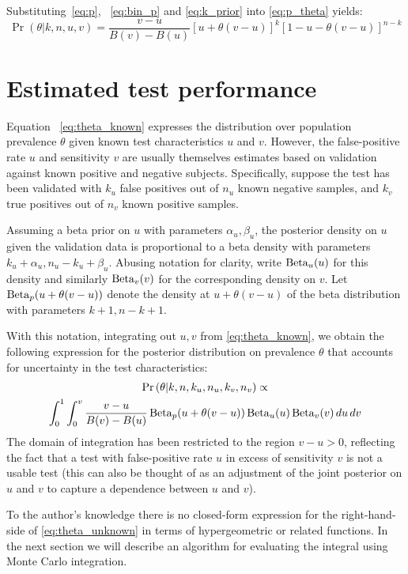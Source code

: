 \documentclass[dvipdfmx]{article}
\begin{document}
Substituting~\eqref{eq:p}, ~\eqref{eq:bin_p} and \eqref{eq:k_prior} into \eqref{eq:p_theta} yields:
\begin{equation}
  \label{eq:theta_known}
  \Pr\left(\theta|k,n,u,v\right) = \frac{v-u}{B(v)-B(u)} [u + \theta(v-u)]^k [1- u - \theta(v-u)]^{n-k}
\end{equation}

\section{Estimated test performance}
Equation ~\eqref{eq:theta_known} expresses the distribution over
population prevalence $\theta$ given known test characteristics $u$
and $v$. However, the false-positive rate $u$ and sensitivity $v$ are
usually themselves estimates based on validation against known
positive and negative subjects. Specifically, suppose the test has
been validated with $k_u$ false positives out of $n_u$ known negative
samples, and $k_v$ true positives out of $n_v$ known positive samples.

Assuming a beta prior on $u$ with parameters $\alpha_u, \beta_u$, the
posterior density on $u$ given the validation data is proportional to
a beta density with parameters $k_u+\alpha_u,n_u-k_u+\beta_u$. Abusing
notation for clarity, write $\operatorname{Beta}_u(u)$ for this density and similarly
$\operatorname{Beta}_v(v)$ for the corresponding density on $v$. Let $\operatorname{Beta}_p(u
+\theta(v-u))$ denote the density at $u +\theta(v-u)$ of the beta
distribution with parameters $k+1,n-k+1$.

With this notation, integrating out $u,v$ from \eqref{eq:theta_known},
we obtain the following expression for the posterior distribution on
prevalence $\theta$ that accounts for uncertainty in the test
characteristics:
\begin{multline}
  \label{eq:theta_unknown}
  \Pr\left(\theta|k,n,k_u,n_u,k_v,n_v\right) \propto \\
  \int_0^1\int_0^v\frac{v-u}{B(v)-B(u)} \operatorname{Beta}_p(u + \theta(v-u))\operatorname{Beta}_u(u)\operatorname{Beta}_v(v)\,du\,dv
\end{multline}
The domain of integration has been restricted to the region 
$v-u>0$, reflecting the fact that a test with false-positive rate $u$
in excess of sensitivity $v$ is not a usable test (this can also be
thought of as an adjustment of the joint posterior on $u$ and $v$ to
capture a dependence between $u$ and $v$).

To the author's knowledge there is no closed-form expression for the
right-hand-side of \eqref{eq:theta_unknown} in terms of hypergeometric
or related functions. In the next section we will describe an
algorithm for evaluating the integral using Monte Carlo integration.
\end{document}
